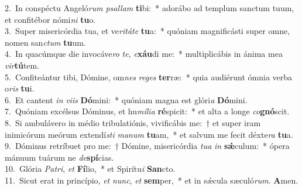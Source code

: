 {2.~}In conspéctu Angeló\textit{rum} \textit{psal}\textit{lam} \textbf{ti}bi:~* adorábo ad templum sanctum tuum, et confitébor nómi\textit{ni} \textbf{tu}o.\\
{3.~}Super misericórdia tua, et ve\textit{ri}\textit{tá}\textit{te} \textbf{tu}a:~* quóniam magnificásti super omne, nomen san\textit{ctum} \textbf{tu}um.\\
{4.~}In quacúmque die invocáve\textit{ro} \textit{te}, \textit{e}\textbf{xáu}di me:~* multiplicábis in ánima mea \textit{vir}\textbf{tú}tem.\\
{5.~}Confiteántur tibi, Dómine, om\textit{nes} \textit{re}\textit{ges} \textbf{ter}ræ:~* quia audiérunt ómnia verba o\textit{ris} \textbf{tu}i.\\
{6.~}Et cantent \textit{in} \textit{vi}\textit{is} \textbf{Dó}mini:~* quóniam magna est glóri\textit{a} \textbf{Dó}mini.\\
{7.~}Quóniam excélsus Dóminus, et hu\textit{mí}\textit{li}\textit{a} \textbf{ré}spicit:~* et alta a longe \textit{co}\textbf{gnó}scit.\\
{8.~}Si ambulávero in médio tribulatiónis, vivificábis me:~† et super iram inimicórum meórum extendí\textit{sti} \textit{ma}\textit{num} \textbf{tu}am,~* et salvum me fecit déxte\textit{ra} \textbf{tu}a.\\
{9.~}Dóminus retríbuet pro me:~† Dómine, misericórdia \textit{tu}\textit{a} \textit{in} \textbf{sǽ}culum:~* ópera mánuum tuárum ne \textit{de}\textbf{spí}cias.\\
{10.~}Glória \textit{Pa}\textit{tri}, \textit{et} \textbf{Fí}lio,~* et Spirítu\textit{i} \textbf{San}cto.\\
{11.~}Sicut erat in princípio, \textit{et} \textit{nunc}, \textit{et} \textbf{sem}per,~* et in sǽcula sæculó\textit{rum}. \textbf{A}men.\\
